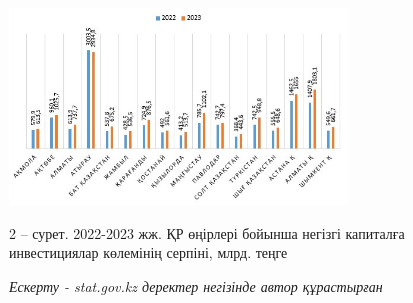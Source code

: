 \begin{figure}[H]
	\centering
	\includegraphics[width=0.8\textwidth]{media/ekon/image1.3}
	\caption*{2 -- сурет. 2022-2023 жж. ҚР өңірлері бойынша негізгі капиталға
	инвестициялар көлемінің серпіні, млрд. теңге}
	\caption*{{\normalfont \emph{Ескерту - stat.gov.kz деректер негізінде автор құрастырған}}}
\end{figure}

